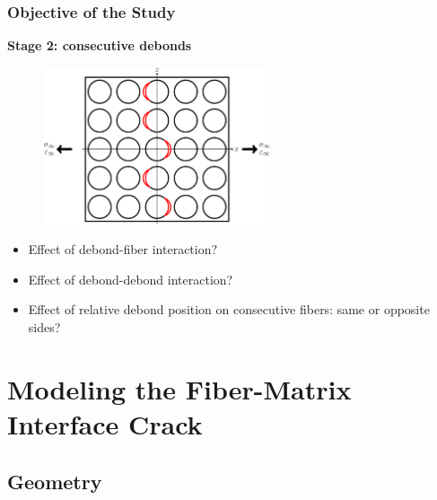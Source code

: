 \documentclass[first,firstsupp,lastsupp,last,hyperref,table]{ETHclass}
\begin{document}
\begin{frame}
\frametitle{\vspace{0.2cm}\small Objective of the Study}
\vspace{-0.5cm}
\centering
\begin{alertblock}{\centering\scriptsize\bf Stage 2: consecutive debonds}
\vspace{-0.25cm}
\begin{figure}
\centering
\includegraphics[width=0.6\textwidth]{stage2-critdebonds.pdf}
\end{figure}
\end{alertblock}
\vspace{-0.5cm}
\begin{itemize}[label=]
\scriptsize
\item Effect of debond-fiber interaction?
\item Effect of debond-debond interaction?
\item Effect of relative debond position on consecutive fibers: same or opposite sides?
\end{itemize}
\end{frame}

\section{Modeling the Fiber-Matrix Interface Crack}

\subsection{Geometry}
\end{document}
